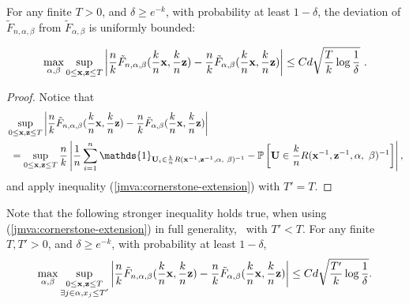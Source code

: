 \begin{lemma}
\label{jmva:lem:Fn-tildeF}
 For any finite  $T>0$, and $\delta\ge e^{-k}$,  with probability at least $1-\delta$, the  deviation of $\tilde F_{n, \alpha, \beta}$ from  $\tilde F_{\alpha, \beta}$ is uniformly bounded: %
 
\begin{align*}
\max_{\alpha, \beta} \sup_{ 0 \le \mathbf x, \mathbf z \le T}
\left| \frac{n}{k} \tilde F_{n, \alpha, \beta}( \frac{k}{n} \mathbf x, \frac{k}{n} \mathbf z)-\frac{n}{k} \tilde F_{\alpha, \beta}( \frac{k}{n} \mathbf x, \frac{k}{n} \mathbf z) \right| \le Cd\sqrt{\frac{T}{k}\log{\frac{1}{\delta}}}~.
\end{align*}
\end{lemma}
\begin{proof}
Notice that 
\begin{align*}
&\sup_{ 0 \le \mb x, \mb z \le T} \left| \frac{n}{k} \tilde F_{n, \alpha, \beta}( \frac{k}{n} \mb x, \frac{k}{n} \mb z)- \frac{n}{k} \tilde F_{\alpha, \beta}( \frac{k}{n} \mb x, \frac{k}{n} \mb z) \right|  \\
&~= \sup_{ 0 \le \mb x, \mb z \le T} \frac{n}{k} \left|  \frac{1}{n}  \sum_{i=1}^n \mathds{1}_{ \mb U_i \in \frac{k}{n} R(\mb x^{-1}, \mb z^{-1}, \alpha,~\beta)^{-1} } -
   \mathbb{P} \left[ \mathbf{U} \in \frac{k}{n} R(\mb x^{-1}, \mb z^{-1}, \alpha,~\beta)^{-1}
   \right] \right|,
\end{align*}
and apply inequality (\ref{jmva:cornerstone-extension}) with $T'=T$.
\end{proof}
%
\begin{remark}
\label{jmva:rk:lem:Fn-tildeF_generalized}
Note that the following stronger inequality holds true, when using (\ref{jmva:cornerstone-extension}) in full generality, \ie~with $T'< T$.
 For any finite  $T, T'>0$, and $\delta\ge e^{-k}$,  with probability at least $1-\delta$,
\begin{align*}
\max_{\alpha, \beta} \sup_{\substack{  0 \le \mathbf x, \mathbf z \le T \\ \exists j \in \alpha, x_j \le T'}}
\left| \frac{n}{k} \tilde F_{n, \alpha, \beta}( \frac{k}{n} \mathbf x, \frac{k}{n} \mathbf z)-\frac{n}{k} \tilde F_{\alpha, \beta}( \frac{k}{n} \mathbf x, \frac{k}{n} \mathbf z) \right| \le Cd\sqrt{\frac{T'}{k}\log{\frac{1}{\delta}}}.
\end{align*}
\end{remark}


